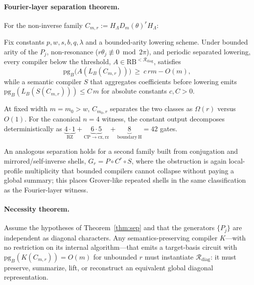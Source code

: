 \documentclass[a4paper]{article}
\begin{document}
\paragraph{Fourier-layer separation theorem.}
For the non-inverse family $C_{m,r}:=H_\Lambda D_m(\theta)^{r}H_\Lambda$:

\begin{theorem}\label{thm:sep}
Fix constants $p,w,s,b,q,\lambda$ and a bounded-arity lowering scheme. Under bounded arity of the
$P_j$, non-resonance ($r\theta_j\not\equiv 0\bmod 2\pi$), and periodic separated lowering, every
compiler below the threshold, $A\in\mathrm{RB}^{<\mathcal{R}_{\mathrm{diag}}}$, satisfies
\[
\mathrm{pg}_B\!\big(A(L_B(C_{m,r}))\big)\ \ge\ c\,rm - O(m),
\]
while a semantic compiler $S$ that aggregates coefficients before lowering emits
$\mathrm{pg}_B(L_B(S(C_{m,r})))\le C\,m$ for absolute constants $c,C>0$.
\end{theorem}

\begin{corollary}\label{cor:fixed}
At fixed width $m=m_0>w$, $C_{m_0,r}$ separates the two classes as $\Omega(r)$ versus $O(1)$. For the
canonical $n=4$ witness, the constant output decomposes deterministically as
$\underbrace{4\!\cdot\!1}_{\mathrm{RZ}}+\underbrace{6\!\cdot\!5}_{\mathrm{CP}\to\mathrm{cx,rz}}
+\underbrace{8}_{\mathrm{boundary\ H}}=42$ gates.
\end{corollary}

An analogous separation holds for a second family built from conjugation and mirrored/self-inverse
shells, $G_r=P\circ C^{r}\circ S$, where the obstruction is again local-profile multiplicity that
bounded compilers cannot collapse without paying a global summary; this places Grover-like repeated
shells in the same classification as the Fourier-layer witness.

\paragraph{Necessity theorem.}

\begin{theorem}\label{thm:nec}
Assume the hypotheses of Theorem~\ref{thm:sep} and that the generators $\{P_j\}$ are independent as
diagonal characters. Any semantics-preserving compiler $K$---with no restriction on its internal
algorithm---that emits a target-basis circuit with $\mathrm{pg}_B(K(C_{m,r}))=O(m)$ for unbounded $r$
must instantiate $\mathcal{R}_{\mathrm{diag}}$: it must preserve, summarize, lift, or reconstruct an
equivalent global diagonal representation.
\end{theorem}
\end{document}
